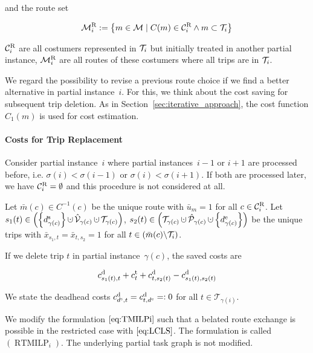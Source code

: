 and the route set

\begin{align*}
	\mathcal{M}^{\operatorname{R}}_i := \left\{m\in\mathcal{M}\mid C(m)\in\mathcal{C}^{\operatorname{R}}_i\land m\subset\mathcal{T}_i\right\}
\end{align*}

$\mathcal{C}^{\operatorname{R}}_i$ are all costumers represented in $\mathcal{T}_i$ but initially treated in another partial instance, $\mathcal{M}^{\operatorname{R}}_i$ are all routes of these costumers where all trips are in $\mathcal{T}_i$.

We regard the possibility to revise a previous route choice if we find a better alternative in partial instance~$i$. For this, we think about the cost saving for subsequent trip deletion. As in Section~\ref{sec:iterative_approach}, the cost function $C_1(m)$ is used for cost estimation.

\paragraph{Costs for Trip Replacement} \parfill

Consider partial instance~$i$ where partial instances~$i-1$ or $i+1$ are processed before, i.e. $\sigma(i)<\sigma(i-1)$ or $\sigma(i)<\sigma(i+1)$. If both are processed later, we have $\mathcal{C}^{\operatorname{R}}_i=\emptyset$ and this procedure is not considered at all.

Let $\bar{m}(c)\in C^{-1}(c)$ be the unique route with $\bar{u}_m = 1$ for all $c\in\mathcal{C}^{\operatorname{R}}_i$. Let $s_1(t)\in\left(\left\{\ds_{\gamma(c)}\right\}\cupdot\hat{\mathcal{V}}_{\gamma(c)}\cupdot\mathcal{T}_{\gamma(c)}\right)$, $s_2(t)\in\left(\mathcal{T}_{\gamma(c)}\cupdot\hat{\mathcal{P}}_{\gamma(c)}\cupdot\left\{\de_{\gamma(c)}\right\}\right)$ be the unique trips with $\bar{x}_{s_1,t}=\bar{x}_{t,s_2}=1$ for all $t\in\left(\bar{m}(c)\backslash\mathcal{T}_i\right)$. 

If we delete trip $t$ in partial instance~$\gamma(c)$, the saved costs are

\begin{align*}
	c^{\operatorname{d}}_{s_1(t),t}+c^{\operatorname{t}}_t+c^{\operatorname{d}}_{t,s_2(t)}-c^{\operatorname{d}}_{s_1(t),s_2(t)}
\end{align*}

We state the deadhead costs $c^{\operatorname{d}}_{d^{\operatorname{s}},t}=c^{\operatorname{d}}_{t,d^{\operatorname{e}}}=:0$ for all $t\in\mathcal{T}_{\gamma(i)}$. 

We modify the formulation $\eqref{eq:TMILPi}$ such that a belated route exchange is possible in the restricted case with $\eqref{eq:LCLS}$. The formulation is called $(\operatorname{RTMILP}_i)$. The underlying partial task graph is not modified.


